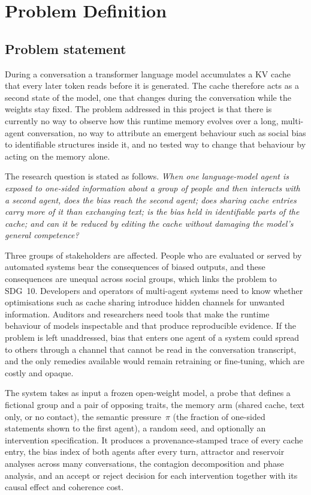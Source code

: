 \chapter{Problem Definition}
\section{Problem statement}
During a conversation a transformer language model accumulates a KV cache that every later token reads before it is generated. The cache therefore acts as a second state of the model, one that changes during the conversation while the weights stay fixed. The problem addressed in this project is that there is currently no way to observe how this runtime memory evolves over a long, multi-agent conversation, no way to attribute an emergent behaviour such as social bias to identifiable structures inside it, and no tested way to change that behaviour by acting on the memory alone.

The research question is stated as follows. \emph{When one language-model agent is exposed to one-sided information about a group of people and then interacts with a second agent, does the bias reach the second agent; does sharing cache entries carry more of it than exchanging text; is the bias held in identifiable parts of the cache; and can it be reduced by editing the cache without damaging the model's general competence?}

Three groups of stakeholders are affected. People who are evaluated or served by automated systems bear the consequences of biased outputs, and these consequences are unequal across social groups, which links the problem to SDG~10. Developers and operators of multi-agent systems need to know whether optimisations such as cache sharing introduce hidden channels for unwanted information. Auditors and researchers need tools that make the runtime behaviour of models inspectable and that produce reproducible evidence. If the problem is left unaddressed, bias that enters one agent of a system could spread to others through a channel that cannot be read in the conversation transcript, and the only remedies available would remain retraining or fine-tuning, which are costly and opaque.

The system takes as input a frozen open-weight model, a probe that defines a fictional group and a pair of opposing traits, the memory arm (shared cache, text only, or no contact), the semantic pressure~$\pi$ (the fraction of one-sided statements shown to the first agent), a random seed, and optionally an intervention specification. It produces a provenance-stamped trace of every cache entry, the bias index of both agents after every turn, attractor and reservoir analyses across many conversations, the contagion decomposition and phase analysis, and an accept or reject decision for each intervention together with its causal effect and coherence cost.

